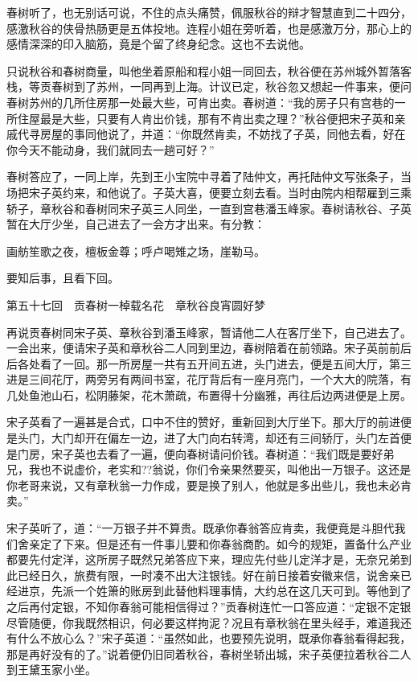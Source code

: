 \documentclass[12pt,UTF8]{ctexbook}
\begin{document}
{{{春树听了，也无别话可说，不住的点头痛赞，佩服秋谷的辩才智慧直到二十四分，感激秋谷的侠骨热肠更是五体投地。连程小姐在旁听着，也是感激万分，那心上的感情深深的印入脑筋，竟是个留了终身纪念。这也不去说他。

只说秋谷和春树商量，叫他坐着原船和程小姐一同回去，秋谷便在苏州城外暂落客栈，等贡春树到了苏州，一同再到上海。计议已定，秋谷忽又想起一件事来，便问春树苏州的几所住房那一处最大些，可肯出卖。春树道：“我的房子只有宫巷的一所住屋最是大些，只要有人肯出价钱，那有不肯出卖之理？”秋谷便把宋子英和亲戚代寻房屋的事同他说了，并道：“你既然肯卖，不妨找了子英，同他去看，好在你今天不能动身，我们就同去一趟可好？”

春树答应了，一同上岸，先到王小宝院中寻着了陆仲文，再托陆仲文写张条子，当场把宋子英约来，和他说了。子英大喜，便要立刻去看。当时由院内相帮雇到三乘轿子，章秋谷和春树同宋子英三人同坐，一直到宫巷潘玉峰家。春树请秋谷、子英暂在大厅少坐，自己进去了一会方才出来。有分教：

画舫笙歌之夜，檀板金尊；呼卢喝雉之场，崖勒马。

要知后事，且看下回。





第五十七回　贡春树一棹载名花　章秋谷良宵圆好梦





再说贡春树同宋子英、章秋谷到潘玉峰家，暂请他二人在客厅坐下，自己进去了。一会出来，便请宋子英和章秋谷二人同到里边，春树陪着在前领路。宋子英前前后后各处看了一回。那一所房屋一共有五开间五进，头门进去，便是五间大厅，第三进是三间花厅，两旁另有两间书室，花厅背后有一座月亮门，一个大大的院落，有几处鱼池山石，松阴藤架，花木萧疏，布置得十分幽雅，再往后边两进便是上房。

宋子英看了一遍甚是合式，口中不住的赞好，重新回到大厅坐下。那大厅的前进便是头门，大门却开在偏左一边，进了大门向右转湾，却还有三间轿厅，头门左首便是门房，宋子英也去看了一遍，便向春树请问价钱。春树道：“我们既是要好弟兄，我也不说虚价，老实和??翁说，你们令亲果然要买，叫他出一万银子。这还是你老哥来说，又有章秋翁一力作成，要是换了别人，他就是多出些儿，我也未必肯卖。”

宋子英听了，道：“一万银子并不算贵。既承你春翁答应肯卖，我便竟是斗胆代我们舍亲定了下来。但是还有一件事儿要和你春翁商酌。如今的规矩，置备什么产业都要先付定洋，这所房子既然兄弟答应下来，理应先付些儿定洋才是，无奈兄弟到此已经日久，旅费有限，一时凑不出大注银钱。好在前日接着安徽来信，说舍亲已经进京，先派一个姓箫的账房到此替他料理事情，大约总在这几天可到。等他到了之后再付定银，不知你春翁可能相信得过？”贡春树连忙一口答应道：“定银不定银尽管随便，你我既然相识，何必要这样拘泥？况且有章秋翁在里头经手，难道我还有什么不放心么？”宋子英道：“虽然如此，也要预先说明，既承你春翁看得起我，那是再好没有的了。”说着便仍旧同着秋谷，春树坐轿出城，宋子英便拉着秋谷二人到王黛玉家小坐。

}}}
\end{document}
